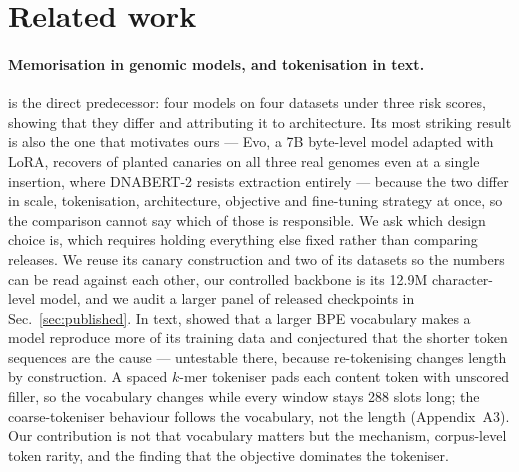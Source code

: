 \section{Related work}
\label{sec:related}

\paragraph{Memorisation in genomic models, and tokenisation in text.}
\cite{nemecek2026quantifying} is the direct predecessor: four models on four datasets under three
risk scores, showing that they differ and attributing it to architecture. Its most striking result is
also the one that motivates ours --- Evo, a 7B byte-level model adapted with LoRA, recovers
 of planted canaries on all three real genomes even at a single insertion, where
DNABERT-2 resists extraction entirely --- because the two differ in scale, tokenisation,
architecture, objective and fine-tuning strategy at once, so the comparison cannot say which of
those is responsible. We ask which design choice is, which requires holding everything else fixed
rather than comparing releases. We reuse its canary construction and two of its datasets so the
numbers can be read against each other, our controlled backbone is its 12.9M character-level model,
and we audit a larger panel of released checkpoints in Sec.~\ref{sec:published}. In text,
\cite{kharitonov2021bpe} showed that a larger BPE vocabulary makes a model reproduce more of its
training data and conjectured that the shorter token sequences are the cause --- untestable there,
because re-tokenising changes length by construction. A spaced $k$-mer tokeniser pads each content
token with unscored filler, so the vocabulary changes while every window stays 288 slots long; the
coarse-tokeniser behaviour follows the vocabulary, not the length (Appendix~A3). Our contribution is
not that vocabulary matters but the mechanism, corpus-level token rarity, and the finding that the
objective dominates the tokeniser.

